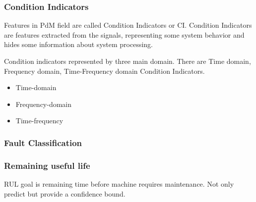\documentclass[class=article, crop=false]{standalone}
\begin{document}

\subsubsection{Condition Indicators}
Features in PdM field are called Condition Indicators or CI.
Condition Indicators are features extracted from the signals, representing some
system behavior and hides some information about system processing.

Condition indicators represented by three main domain. There are Time
domain, Frequency domain, Time-Frequency domain Condition Indicators.

\begin{itemize}
    \item Time-domain
    \item Frequency-domain
    \item Time-frequency
\end{itemize}

\subsubsection{Fault Classification}

\subsubsection{Remaining useful life}
RUL goal is remaining time before machine requires maintenance. Not only
predict but provide a confidence bound.
\end{document}

